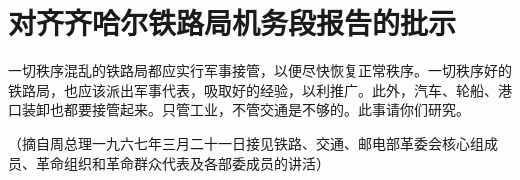 \section[对齐齐哈尔铁路局机务段报告的批示（一九六七年三月二十日）]{对齐齐哈尔铁路局机务段报告的批示}


一切秩序混乱的铁路局都应实行军事接管，以便尽快恢复正常秩序。一切秩序好的铁路局，也应该派出军事代表，吸取好的经验，以利推广。此外，汽车、轮船、港口装卸也都要接管起来。只管工业，不管交通是不够的。此事请你们研究。

{\raggedleft （摘自周总理一九六七年三月二十一日接见铁路、交通、邮电部革委会核心组成员、革命组织和革命群众代表及各部委成员的讲活）\par}


